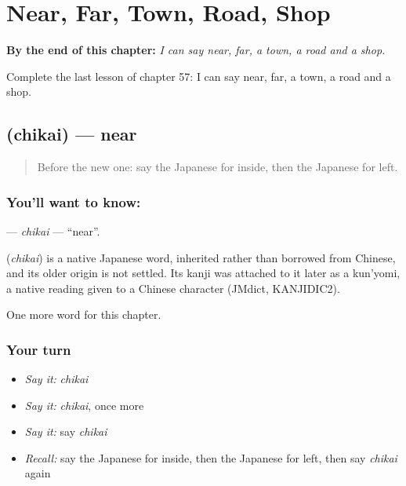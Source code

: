 
\chapter{Near, Far, Town, Road, Shop}
\label{ch:ja-near-far-town-road-shop}

\begin{chapteropening}
\textbf{By the end of this chapter:} \emph{I can say near, far, a town, a road and a shop.}

Complete the last lesson of chapter 57: I can say near, far, a town, a road and a shop.
\end{chapteropening}

\section[\texorpdfstring{\ja{ちかい} (chikai)}{ちかい (chikai)}]{ (chikai) — near}

\label{lesson:JA-C57-chikai}



\begin{quote}
Before the new one: say the Japanese for inside, then the Japanese for left.
\end{quote}

\subsection*{You'll want to know: }
\textbf{} — \emph{chikai} — \textquotedblleft{}near\textquotedblright{}.

\begin{cousinweb}
\textbf{} (\emph{chikai}) is a native Japanese word, inherited rather than borrowed from Chinese, and its older origin is not settled. Its kanji was attached to it later as a kun'yomi, a native reading given to a Chinese character (JMdict, KANJIDIC2).
\end{cousinweb}

\begin{grammarlens}[title={What you've built}]
One more word for this chapter.
\end{grammarlens}

\subsection*{Your turn}
\begin{itemize}
\raggedright
  \item \emph{Say it:} \emph{chikai}
  \item \emph{Say it:} \emph{chikai}, once more
  \item \emph{Say it:} say \emph{chikai}
  \item \emph{Recall:} say the Japanese for inside, then the Japanese for left, then say \emph{chikai} again
\end{itemize}

